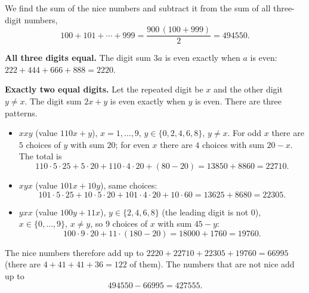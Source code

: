 We find the sum of the nice numbers and subtract it from the sum of all three-digit numbers,
\[
100+101+\cdots+999=\dfrac{900\,(100+999)}{2}=494550 .
\]

\textbf{All three digits equal.} The digit sum $3a$ is even exactly when $a$ is even: $222+444+666+888=2220$.

\textbf{Exactly two equal digits.} Let the repeated digit be $x$ and the other digit $y\ne x$. The digit sum $2x+y$ is even exactly when $y$ is even. There are three patterns.
\begin{itemize}
\item $xxy$ (value $110x+y$), $x=1,\dots,9$, $y\in\{0,2,4,6,8\}$, $y\ne x$. For odd $x$ there are $5$ choices of $y$ with sum $20$; for even $x$ there are $4$ choices with sum $20-x$. The total is
\[
110\cdot5\cdot25+5\cdot20+110\cdot4\cdot20+(80-20)=13850+8860=22710 .
\]
\item $xyx$ (value $101x+10y$), same choices:
\[
101\cdot5\cdot25+10\cdot5\cdot20+101\cdot4\cdot20+10\cdot60=13625+8680=22305 .
\]
\item $yxx$ (value $100y+11x$), $y\in\{2,4,6,8\}$ (the leading digit is not $0$), $x\in\{0,\dots,9\}$, $x\ne y$, so $9$ choices of $x$ with sum $45-y$:
\[
100\cdot9\cdot20+11\cdot(180-20)=18000+1760=19760 .
\]
\end{itemize}
The nice numbers therefore add up to $2220+22710+22305+19760=66995$ (there are $4+41+41+36=122$ of them). The numbers that are not nice add up to
\[
494550-66995=\boxed{427555}.
\]
